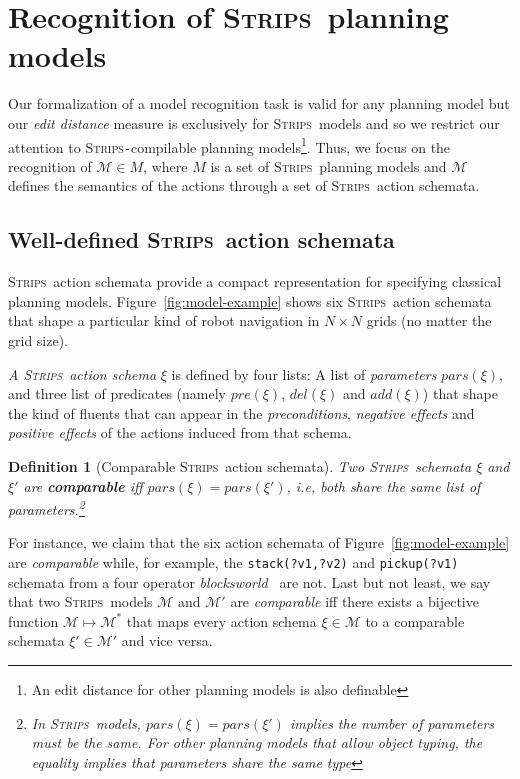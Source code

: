\documentclass[letterpaper]{article} %
\newcommand{\strips}{\textsc{Strips}}     %
\newtheorem{definition}[theorem]{Definition}
\begin{document}
\section{Recognition of \strips\ planning models}
\label{sec:asPlanning}

Our formalization of a model recognition task is valid for any planning model but our \emph{edit distance} measure is exclusively for \strips\ models and so we restrict our attention to \strips\texttt{-}compilable planning models\footnote{An edit distance for other planning models is also definable}. Thus, we focus on the recognition of $\mathcal{M}\in M$, where $M$ is a set of \strips\ planning models and $\mathcal{M}$ defines the semantics of the actions through a set of \strips\ action schemata.


\subsection{Well-defined \strips\ action schemata}
\strips\ action schemata provide a compact representation for specifying classical planning models. Figure~\ref{fig:model-example} shows six \strips\ action schemata that shape a particular kind of robot navigation in $N\times N$ grids (no matter the grid size).

{\em A \strips\ action schema} $\xi$ is defined by four lists: A list of {\em parameters} $pars(\xi)$, and three list of predicates (namely $pre(\xi)$, $del(\xi)$ and $add(\xi)$) that shape the kind of fluents that can appear in the {\em preconditions}, {\em negative effects} and {\em positive effects} of the actions induced from that schema.

\begin{definition}[Comparable \strips\ action schemata]
Two \strips\ schemata $\xi$ and $\xi'$ are {\bf comparable} iff $pars(\xi)=pars(\xi')$, i.e, both share the same list of parameters.\footnote{In \strips\ models, $pars(\xi)=pars(\xi')$ implies the number of parameters must be the same. For other planning models that allow object typing, the equality implies that parameters share the same type}
\end{definition}

For instance, we claim that the six action schemata of Figure~\ref{fig:model-example} are {\em comparable} while, for example, the {\small\tt stack(?v1,?v2)} and {\small\tt pickup(?v1)} schemata from a four operator {\em blocksworld}~\cite{slaney2001blocks} are not. Last but not least, we say that two \strips\ models $\mathcal{M}$ and $\mathcal{M}'$ are {\em comparable} iff there exists a bijective function $\mathcal{M} \mapsto \mathcal{M}^*$ that maps every action schema $\xi\in\mathcal{M}$ to a comparable schemata $\xi'\in\mathcal{M'}$ and vice versa.
\end{document}
